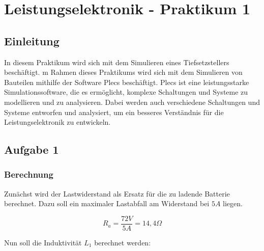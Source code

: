 \documentclass{report}
\begin{document}

\newpage

\tableofcontents

\listoffigures

\newpage
\chapter{Leistungselektronik - Praktikum 1}
\section{Einleitung}

In diesem Praktikum wird sich mit dem Simulieren eines Tiefsetzstellers beschäftigt. m Rahmen dieses Praktikums wird sich mit dem Simulieren von Bauteilen mithilfe der Software Plecs beschäftigt. Plecs ist eine leistungsstarke Simulationssoftware, die es ermöglicht, komplexe Schaltungen und Systeme zu modellieren und zu analysieren. Dabei werden auch verschiedene Schaltungen und Systeme entworfen und analysiert, um ein besseres Verständnis für die Leistungselektronik zu entwickeln.

\section{Aufgabe 1}
\subsection{Berechnung}
Zunächst wird der Lastwiderstand als Ersatz für die zu ladende Batterie berechnet. Dazu soll ein maximaler Lastabfall am Widerstand bei $5A$ liegen.


\begin{equation}
  R_{a} = \frac{72V}{5A} = 14,4\Omega
  \label{eq:Lastwiderstand}
\end{equation}

Nun soll die Induktivität $L_1$ berechnet werden:
  
\end{document}

